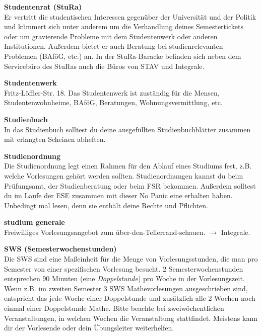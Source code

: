 \begin{multicols}{2}
\vfill\columnbreak

\textbf{Studentenrat (StuRa)} \\
Er vertritt die studentischen Interessen gegenüber der Universität und der Politik und kümmert sich unter anderem um die Verhandlung deines Semestertickets oder um gravierende Probleme mit dem Studentenwerk oder anderen Institutionen.
Außerdem bietet er auch Beratung bei studienrelevanten Problemen (BAföG, etc.) an.
In der StuRa-Baracke befinden sich neben dem Servicebüro des StuRas auch die Büros von STAV und Integrale. 

\textbf{Studentenwerk} \\
Fritz-Löffler-Str. 18.
Das Studentenwerk ist zuständig für die Mensen, Studentenwohnheime, BAföG, Beratungen, Wohnungsvermittlung, etc. 

\textbf{Studienbuch} \\
In das Studienbuch solltest du deine ausgefüllten Studienbuchblätter zusammen mit erlangten Scheinen abheften.

\textbf{Studienordnung} \\
Die Studienordnung legt einen Rahmen für den Ablauf eines Studiums fest, z.B. welche Vorlesungen gehört werden sollten.
Studienordnungen kannst du beim Prüfungsamt, der Studienberatung oder beim FSR bekommen.
Außerdem solltest du im Laufe der ESE zusammen mit dieser No Panic eine erhalten haben.
Unbedingt mal lesen, denn sie enthält deine Rechte und Pflichten.

\vfill\columnbreak

\textbf{studium generale} \\
Freiwilliges Vorlesungsangebot zum über-den-Tellerrand-schauen.
$\rightarrow$ Integrale.

\textbf{SWS (Semesterwochenstunden)} \\
Die SWS sind eine Maßeinheit für die Menge von Vorlesungsstunden, die man pro Semester von einer spezifischen Vorlesung besucht.
2 Semesterwochenstunden entsprechen 90 Minuten (eine \emph{Doppelstunde}) pro Woche in der Vorlesungszeit.
Wenn z.B. im zweiten Semester 3 SWS Mathevorlesungen ausgeschrieben sind, entspricht das jede Woche einer Doppelstunde und zusätzlich alle 2 Wochen noch einmal einer Doppelstunde Mathe.
Bitte beachte bei zweiwöchentlichen Veranstaltungen, in welchen Wochen die Veranstaltung stattfindet. Meistens kann dir der Vorlesende oder dein Übungsleiter weiterhelfen.


\end{multicols}
